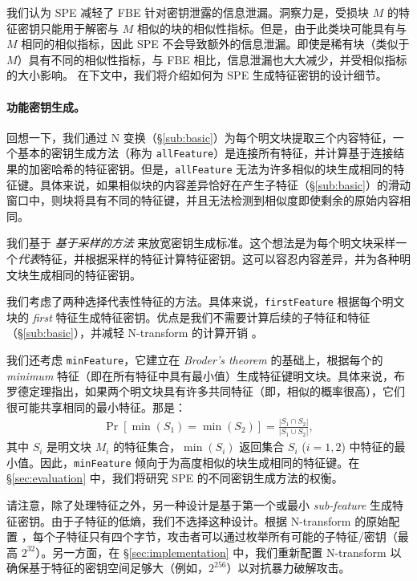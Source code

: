 我们认为 SPE 减轻了 FBE 针对密钥泄露的信息泄漏。洞察力是，受损块 $M$ 的特征密钥只能用于解密与 $M$ 相似的块的相似性指标。但是，由于此类块可能具有与 $M$ 相同的相似指标，因此 SPE 不会导致额外的信息泄漏。即使是稀有块（类似于 $M$）具有不同的相似性指标，与 FBE 相比，信息泄漏也大大减少，并受相似指标的大小影响。
在下文中，我们将介绍如何为 SPE 生成特征密钥的设计细节。


\paragraph{功能密钥生成。}
回想一下，我们通过 N 变换（\S\ref{sub:basic}）为每个明文块提取三个内容特征，一个基本的密钥生成方法（称为 {\tt allFeature}）是连接所有特征，并计算基于连接结果的加密哈希的特征密钥。但是，{\tt allFeature} 无法为许多相似的块生成相同的特征键。具体来说，如果相似块的内容差异恰好在产生子特征（\S\ref{sub:basic}）的滑动窗口中，则块将具有不同的特征键，并且无法检测到相似度即使剩余的原始内容相同。

我们基于 {\em 基于采样的方法} \cite{bhagwat09, dong11, qin17} 来放宽密钥生成标准。这个想法是为每个明文块采样一个{\em 代表}特征，并根据采样的特征计算特征密钥。这可以容忍内容差异，并为各种明文块生成相同的特征密钥。

我们考虑了两种选择代表性特征的方法。具体来说，{\tt firstFeature} 根据每个明文块的 {\em first} 特征生成特征密钥。优点是我们不需要计算后续的子特征和特征（\S\ref{sub:basic}），并减轻 N-transform 的计算开销 \cite{zhang19}。

我们还考虑 {\tt minFeature}，它建立在 {\em Broder's theorem} \cite{broder97} 的基础上，根据每个的 {\em minimum} 特征（即在所有特征中具有最小值）生成特征键明文块。具体来说，布罗德定理指出，如果两个明文块具有许多共同特征（即，相似的概率很高），它们很可能共享相同的最小特征。那是：
\begin{eqnarray}
  \label{eq:broder}
 \Pr[\min(S_1) = \min(S_2)] = \frac{|S_1 \cap S_2|}{|S_1 \cup S_2|},
\end{eqnarray}
其中 $S_i$ 是明文块 $M_i$ 的特征集合，$\min(S_i)$ 返回集合 $S_i$ ($i = 1, 2$) 中特征的最小值。因此，{\tt minFeature} 倾向于为高度相似的块生成相同的特征键。在 \S\ref{sec:evaluation} 中，我们将研究 SPE 的不同密钥生成方法的权衡。

请注意，除了处理特征之外，另一种设计是基于第一个或最小 {\em sub-feature} 生成特征密钥。由于子特征的低熵，我们不选择这种设计。根据 N-transform 的原始配置 \cite{shilane12}，每个子特征只有四个字节，攻击者可以通过枚举所有可能的子特征/密钥（最高 $2^{ 32}$）。另一方面，在 \S\ref{sec:implementation} 中，我们重新配置 N-transform 以确保基于特征的密钥空间足够大（例如，$2^{256}$）以对抗暴力破解攻击。


